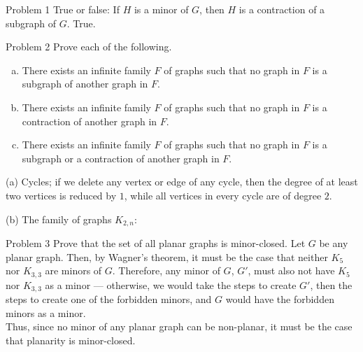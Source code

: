 \documentclass[8pt]{extarticle}
\title{}
\author{}
\date{}
\begin{document}
  \begin{problem}{Problem 1}
    True or false: If $H$ is a minor of $G$, then $H$ is a contraction of a subgraph of $G$.
    \tcblower
    True.
  \end{problem}
  \begin{problem}{Problem 2}
    Prove each of the following.
    \begin{enumerate}[(a)]
      \item There exists an infinite family $F$ of graphs such that no graph in $F$ is a subgraph of another graph in $F$.
      \item There exists an infinite family $F$ of graphs such that no graph in $F$ is a contraction of another graph in $F$.
      \item There exists an infinite family $F$ of graphs such that no graph in $F$ is a subgraph or a contraction of another graph in $F$.
    \end{enumerate}
    \tcblower
    \begin{problem}{(a)}
      Cycles; if we delete any vertex or edge of any cycle, then the degree of at least two vertices is reduced by $1$, while all vertices in every cycle are of degree $2$.
    \end{problem}
    \begin{problem}{(b)}
      The family of graphs $K_{2,n}$:
      \begin{center}
      \end{center}
    \end{problem}
  \end{problem}
  \begin{problem}{Problem 3}
    Prove that the set of all planar graphs is minor-closed.
    \tcblower
    Let $G$ be any planar graph. Then, by Wagner's theorem, it must be the case that neither $K_{5}$ nor $K_{3,3}$ are minors of $G$. Therefore, any minor of $G$, $G'$, must also not have $K_{5}$ nor $K_{3,3}$ as a minor --- otherwise, we would take the steps to create $G'$, then the steps to create one of the forbidden minors, and $G$ would have the forbidden minors as a minor.\\

    Thus, since no minor of any planar graph can be non-planar, it must be the case that planarity is minor-closed.
  \end{problem}
\end{document}
